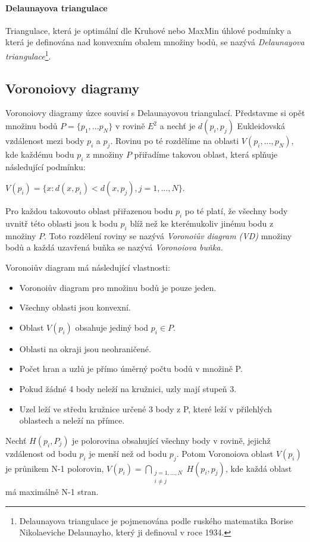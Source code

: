 \documentclass[12pt,a4paper]{article}
\begin{document}
\paragraph{Delaunayova triangulace}
Triangulace, která je optimální dle Kruhové nebo MaxMin úhlové podmínky a která je definována nad konvexním obalem množiny bodů, se nazývá \emph{Delaunayova triangulace}\footnote{Delaunayova triangulace je pojmenována podle ruského matematika Borise Nikolaeviche Delaunayho\cite{Delaunay}, který ji definoval v roce 1934.}.

\newpage
\subsection{Voronoiovy diagramy}

Voronoiovy diagramy úzce souvisí s Delaunayovou triangulací. Představme si opět množinu bodů $P = \{p_1,...p_N\} $ v rovině $E^2$ a nechť je $d(p_i,p_j) $ Eukleidovská vzdálenost mezi body $p_i$ a $p_j$. Rovinu po té rozdělíme na oblasti $V(p_i,...,p_N)$, kde každému bodu $p_i$ z množiny $P$ přiřadíme takovou oblast, která splňuje následující podmínku: 

$V(p_i) = \{ x: d(x, p_i) < d(x, p_j), j = 1,...,N\}$.

Pro každou takovouto oblast přiřazenou bodu $p_i$ po té platí, že všechny body uvnitř této oblasti jsou k bodu $p_i$ blíž než ke kterémukoliv jinému bodu z množiny $P$. Toto rozdělení roviny se nazývá \emph{Voronoiův diagram (VD)} množiny bodů a každá uzavřená buňka se nazývá \emph{Voronoiova buňka.}

\bigskip
Voronoiův diagram má následující vlastnosti: 
\begin{itemize}
\item Voronoiův diagram pro množinu bodů je pouze jeden.
\item Všechny oblasti jsou konvexní.
\item Oblast $V(p_i)$ obsahuje jediný bod $p_i \in P$.
\item Oblasti na okraji jsou neohraničené.
\item Počet hran a uzlů je přímo úměrný počtu bodů v množině P.
\item Pokud žádné 4 body neleží na kružnici, uzly mají stupeň 3.
\item Uzel leží ve středu kružnice určené 3 body z P, které leží v přilehlých oblastech a neleží na přímce.
\end{itemize}

Nechť $H(p_i,P_j)$ je polorovina obsahující všechny body v rovině, jejichž vzdálenost od bodu $p_i$ je menší než od bodu $p_j$. Potom Voronoiova oblast $V(p_i)$ je průnikem N-1 polorovin,
$V(p_i)= \bigcap\limits_{\substack{j=1,...,N \\ i\not=j}}H(p_i,p_j)$, kde každá oblast má maximálně N-1 stran.
\end{document}

